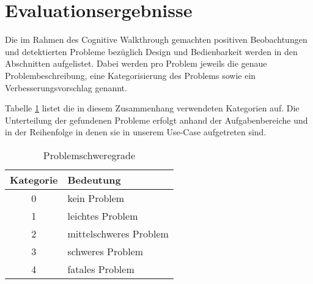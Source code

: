 \section{Evaluationsergebnisse}
Die im Rahmen des Cognitive Walkthrough gemachten positiven Beobachtungen und detektierten Probleme bezüglich Design und Bedienbarkeit werden in den Abschnitten aufgelistet. Dabei werden pro Problem jeweils die genaue Problembeschreibung, eine Kategorisierung des Problems sowie ein Verbesserungsvorschlag genannt.

Tabelle \ref{tbl:categories} listet die in diesem Zusammenhang verwendeten Kategorien auf. Die Unterteilung der gefundenen Probleme erfolgt anhand der Aufgabenbereiche und in der Reihenfolge in denen sie in unserem Use-Case aufgetreten sind.

\begin{table}[h]
	\centering\begin{tabular}{|c|l|}
		\hline
		\textbf{Kategorie} & \textbf{Bedeutung} \\
		\hline
		0 & kein Problem \\
		1 & leichtes Problem \\
		2 & mittelschweres Problem \\
		3 & schweres Problem \\
		4 & fatales Problem \\
		\hline
	\end{tabular}
	\caption{Problemschweregrade\label{tbl:categories}}
\end{table}